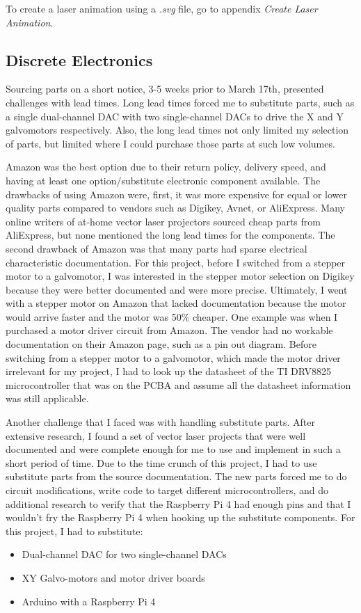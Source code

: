 \documentclass[journal]{IEEEtran}
\begin{document}
    To create a laser animation using a \emph{.svg} file, go to appendix \emph{Create Laser Animation}.

    \subsection{Discrete Electronics}
    Sourcing parts on a short notice, 3-5 weeks prior to March 17th, presented challenges with lead times.
    Long lead times forced me to substitute parts, such as a single dual-channel DAC with two single-channel DACs to drive the X and Y galvomotors respectively.
    Also, the long lead times not only limited my selection of parts, but limited where I could purchase those parts at such low volumes.


    Amazon was the best option due to their return policy, delivery speed, and having at least one option/substitute electronic component available.
    The drawbacks of using Amazon were, first, it was more expensive for equal or lower quality parts compared to vendors such as Digikey, Avnet, or AliExpress.
    Many online writers of at-home vector laser projectors sourced cheap parts from AliExpress, but none mentioned the long lead times for the components.
    The second drawback of Amazon was that many parts had sparse electrical characteristic documentation.
    For this project, before I switched from a stepper motor to a galvomotor, I was interested in the stepper motor selection on Digikey because they were better documented and were more precise. 
    Ultimately, I went with a stepper motor on Amazon that lacked documentation because the motor would arrive faster and the motor was 50\% cheaper. 
    One example was when I purchased a motor driver circuit from Amazon.
    The vendor had no workable documentation on their Amazon page, such as a pin out diagram.
    Before switching from a stepper motor to a galvomotor, which made the motor driver irrelevant for my project, I had to look up the datasheet of the TI DRV8825 microcontroller that was on the PCBA and assume all the datasheet information was still applicable.

    Another challenge that I faced was with handling substitute parts. 
    After extensive research, I found a set of vector laser projects that were well documented and were complete enough for me to use and implement in such a short period of time.
    Due to the time crunch of this project, I had to use substitute parts from the source documentation.
    The new parts forced me to do circuit modifications, write code to target different microcontrollers, and do additional research to verify that the Raspberry Pi 4 had enough pins and that I wouldn't fry the Raspberry Pi 4 when hooking up the substitute components.
    For this project, I had to substitute:
    \begin{itemize}
        \item Dual-channel DAC for two single-channel DACs
        \item XY Galvo-motors and motor driver boards
        \item Arduino with a Raspberry Pi 4
    \end{itemize} 
\end{document}
